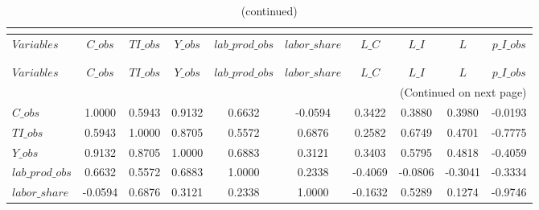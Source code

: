  
\begin{center}
\begin{longtable}{lccccccccc} 
\caption{MATRIX OF CORRELATIONS}\\
 \label{Table:th_corr_matrix}\\
\toprule 
$Variables       $	 & 	 $           C\_obs$	 & 	 $          TI\_obs$	 & 	 $           Y\_obs$	 & 	 $  lab\_prod\_obs$	 & 	 $     labor\_share$	 & 	 $             L\_C$	 & 	 $             L\_I$	 & 	 $                 L$	 & 	 $       p\_I\_obs$\\
\midrule \endfirsthead 
\caption{(continued)}\\
 \toprule \\ 
$Variables       $	 & 	 $           C\_obs$	 & 	 $          TI\_obs$	 & 	 $           Y\_obs$	 & 	 $  lab\_prod\_obs$	 & 	 $     labor\_share$	 & 	 $             L\_C$	 & 	 $             L\_I$	 & 	 $                 L$	 & 	 $       p\_I\_obs$\\
\midrule \endhead 
\midrule \multicolumn{10}{r}{(Continued on next page)} \\ \bottomrule \endfoot 
\bottomrule \endlastfoot 
$C\_obs          $	 & 	            1.0000	 & 	            0.5943	 & 	            0.9132	 & 	            0.6632	 & 	           -0.0594	 & 	            0.3422	 & 	            0.3880	 & 	            0.3980	 & 	           -0.0193 \\ 
$TI\_obs         $	 & 	            0.5943	 & 	            1.0000	 & 	            0.8705	 & 	            0.5572	 & 	            0.6876	 & 	            0.2582	 & 	            0.6749	 & 	            0.4701	 & 	           -0.7775 \\ 
$Y\_obs          $	 & 	            0.9132	 & 	            0.8705	 & 	            1.0000	 & 	            0.6883	 & 	            0.3121	 & 	            0.3403	 & 	            0.5795	 & 	            0.4818	 & 	           -0.4059 \\ 
$lab\_prod\_obs  $	 & 	            0.6632	 & 	            0.5572	 & 	            0.6883	 & 	            1.0000	 & 	            0.2338	 & 	           -0.4069	 & 	           -0.0806	 & 	           -0.3041	 & 	           -0.3334 \\ 
$labor\_share    $	 & 	           -0.0594	 & 	            0.6876	 & 	            0.3121	 & 	            0.2338	 & 	            1.0000	 & 	           -0.1632	 & 	            0.5289	 & 	            0.1274	 & 	           -0.9746 \\ 

\end{longtable}
\end{center}
